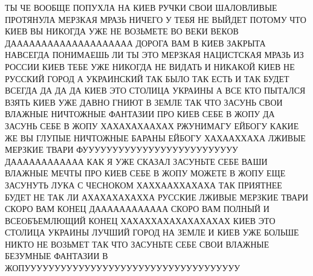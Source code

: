  
 
 
 
 

ТЫ ЧЕ ВООБЩЕ ПОПУХЛА НА КИЕВ РУЧКИ СВОИ ШАЛОВЛИВЫЕ ПРОТЯНУЛА МЕРЗКАЯ МРАЗЬ
НИЧЕГО У ТЕБЯ НЕ ВЫЙДЕТ ПОТОМУ ЧТО КИЕВ ВЫ НИКОГДА УЖЕ НЕ ВОЗЬМЕТЕ ВО ВЕКИ ВЕКОВ
ДАААААААААААААААААААА ДОРОГА ВАМ В КИЕВ ЗАКРЫТА НАВСЕГДА ПОНИМАЕШЬ ЛИ ТЫ ЭТО
МЕРЗКАЯ НАЦИСТСКАЯ МРАЗЬ ИЗ РОССИИ КИЕВ ТЕБЕ УЖЕ НИКОГДА НЕ ВИДАТЬ
И НИКАКОЙ КИЕВ НЕ РУССКИЙ ГОРОД А УКРАИНСКИЙ ТАК БЫЛО ТАК ЕСТЬ И ТАК БУДЕТ ВСЕГДА
ДА ДА ДА КИЕВ ЭТО СТОЛИЦА УКРАИНЫ А ВСЕ КТО ПЫТАЛСЯ ВЗЯТЬ КИЕВ УЖЕ ДАВНО ГНИЮТ В ЗЕМЛЕ
ТАК ЧТО ЗАСУНЬ СВОИ ВЛАЖНЫЕ НИЧТОЖНЫЕ ФАНТАЗИИ ПРО КИЕВ СЕБЕ В ЖОПУ ДА ЗАСУНЬ СЕБЕ В ЖОПУ
ХАХАХАХААХАХ РЖУНИМАГУ ЕЙБОГУ КАКИЕ ЖЕ ВЫ ГЛУПЫЕ НИЧТОЖНЫЕ БАРАНЫ ЕЙБОГУ ХАХААХХАХА
ЛЖИВЫЕ МЕРЗКИЕ ТВАРИ ФУУУУУУУУУУУУУУУУУУУУУУУУУУ ДАААААААААААА КАК Я УЖЕ СКАЗАЛ
ЗАСУНЬТЕ СЕБЕ ВАШИ ВЛАЖНЫЕ МЕЧТЫ ПРО КИЕВ СЕБЕ В ЖОПУ МОЖЕТЕ В ЖОПУ ЕЩЕ 
ЗАСУНУТЬ ЛУКА С ЧЕСНОКОМ ХАХХААХХАХАХА ТАК ПРИЯТНЕЕ БУДЕТ НЕ ТАК ЛИ АХАХАХАХАХХА
РУССКИЕ ЛЖИВЫЕ МЕРЗКИЕ ТВАРИ СКОРО ВАМ КОНЕЦ ДАААААААААААА СКОРО ВАМ ПОЛНЫЙ И ВСЕОБЪЕМЛЮЩИЙ КОНЕЦ
ХАХАХХАХАХАХАХАХАХ КИЕВ ЭТО СТОЛИЦА УКРАИНЫ ЛУЧШИЙ ГОРОД НА ЗЕМЛЕ И КИЕВ УЖЕ БОЛЬШЕ НИКТО НЕ ВОЗЬМЕТ
ТАК ЧТО ЗАСУНЬТЕ СЕБЕ СВОИ ВЛАЖНЫЕ БЕЗУМНЫЕ ФАНТАЗИИ В ЖОПУУУУУУУУУУУУУУУУУУУУУУУУУУУУУУУУУУУУ

